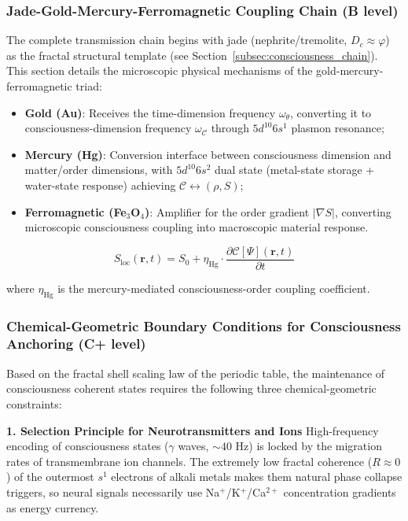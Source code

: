 \documentclass[12pt,a4paper,twocolumn]{article}
\renewcommand{\phi}{\varphi}
\begin{document}
\subsubsection{Jade-Gold-Mercury-Ferromagnetic Coupling Chain (B level)}

The complete transmission chain begins with jade (nephrite/tremolite, $D_c\approx\phi$) as the fractal structural template (see Section~\ref{subsec:consciousness_chain}). This section details the microscopic physical mechanisms of the gold-mercury-ferromagnetic triad:

\begin{itemize}
\item \textbf{Gold (Au)}: Receives the time-dimension frequency $\omega_\theta$, converting it to consciousness-dimension frequency $\omega_{\mathcal{C}}$ through $5d^{10}6s^1$ plasmon resonance;
\item \textbf{Mercury (Hg)}: Conversion interface between consciousness dimension and matter/order dimensions, with $5d^{10}6s^2$ dual state (metal-state storage + water-state response) achieving $\mathcal{C} \leftrightarrow (\rho, S)$;
\item \textbf{Ferromagnetic (Fe$_3$O$_4$)}: Amplifier for the order gradient $|\nabla S|$, converting microscopic consciousness coupling into macroscopic material response.
\end{itemize}

\begin{equation}
S_{\text{loc}}(\mathbf{r}, t) = S_0 + \eta_{\text{Hg}} \cdot \frac{\partial \mathcal{C}[\Psi](\mathbf{r}, t)}{\partial t}
\end{equation}

where $\eta_{\text{Hg}}$ is the mercury-mediated consciousness-order coupling coefficient.

\subsubsection{Chemical-Geometric Boundary Conditions for Consciousness Anchoring (C+ level)}
Based on the fractal shell scaling law of the periodic table, the maintenance of consciousness coherent states requires the following three chemical-geometric constraints:

\textbf{1. Selection Principle for Neurotransmitters and Ions}
High-frequency encoding of consciousness states ($\gamma$ waves, $\sim40$ Hz) is locked by the migration rates of transmembrane ion channels. The extremely low fractal coherence ($R\approx0$) of the outermost $s^1$ electrons of alkali metals makes them natural phase collapse triggers, so neural signals necessarily use Na$^+$/K$^+$/Ca$^{2+}$ concentration gradients as energy currency.
\end{document}
